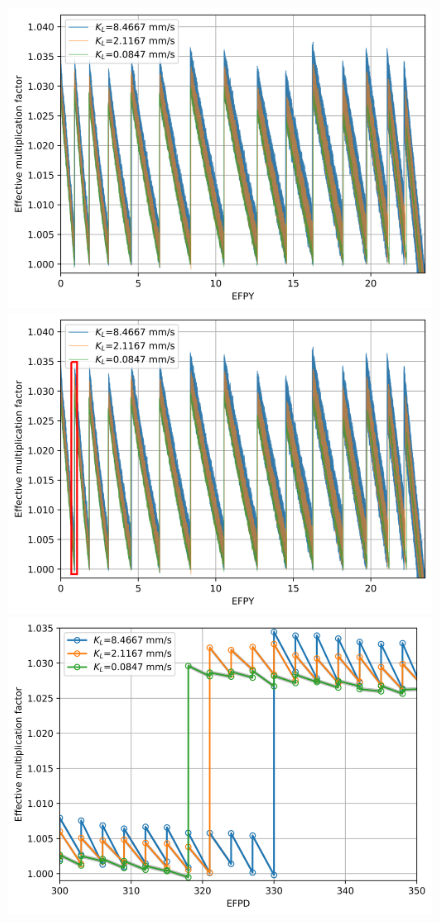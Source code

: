 \begin{frame}
\begin{columns}
	\column{8cm}
	\begin{figure}[ht!] 
		\begin{overprint}
			\includegraphics[width=\textwidth]{../dissertation/figures/ch4/eps/keff.png}
			\onslide<2>\includegraphics[width=\textwidth]{./images/keff_z_1.png}
			\onslide<3>\includegraphics[width=\textwidth]{../dissertation/figures/ch4/eps/keff_zoomed_1.png}

\end{overprint}
\end{figure}
\end{columns}
\end{frame}
